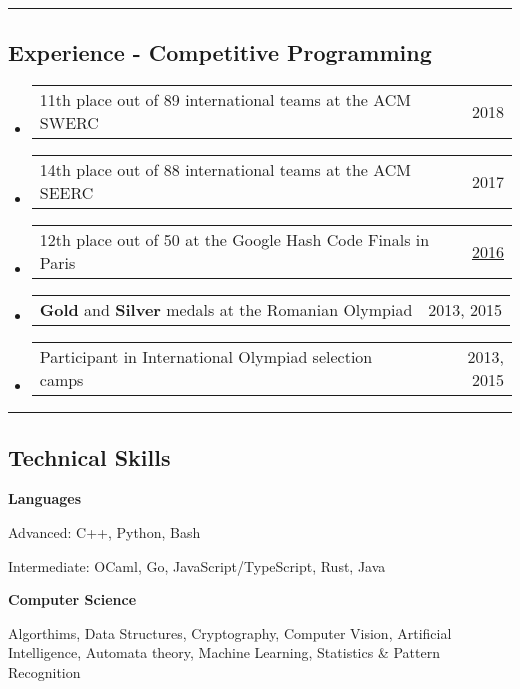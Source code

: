 \documentclass[10pt,letterpaper]{article}
\makeatletter
\newenvironment{indentsection}[1]%
{\begin{list}{}%
	{\setlength{\leftmargin}{#1}}%
	\item[]%
}
{\end{list}}
\newcommand{\headerrow}[2]
{\begin{tabular*}{\linewidth}{l@{\extracolsep{\fill}}r}
	#1 &
	#2 \\
\end{tabular*}}
\makeatother
\begin{document}
\hrule

\vspace{-1em}

\subsection*{Experience - Competitive Programming}
\begin{itemize}
	\parskip=0.1em
		\item
		\headerrow
			{11th place out of 89 international teams at the ACM SWERC}
			{2018}

		\item
		\headerrow
			{14th place out of 88 international teams at the ACM SEERC}
			{2017}

		\item
		\headerrow
			{12th place out of 50 at the Google Hash Code Finals in Paris}
            {\href{https://hashcode.withgoogle.com/hashcode_2016.html}{2016}}

        \item
		\headerrow
            {\textbf{Gold} and \textbf{Silver} medals at the Romanian Olympiad}
			{2013, 2015}

        \item
		\headerrow
            {Participant in International Olympiad selection camps}
			{2013, 2015}

\end{itemize}

\hrule
\vspace{-1em}

\subsection*{Technical Skills}

\begin{indentsection}{\parindent}
\begin{description*}
	\item
	{\textbf{Languages}}

	\begin{itemize*}
        \item {Advanced: C++, Python, Bash}
        \item {Intermediate: OCaml, Go, JavaScript/TypeScript, Rust, Java}
	\end{itemize*}

	\item
	{\textbf{Computer Science}}

    Algorthims, Data Structures, Cryptography, Computer Vision, Artificial
    Intelligence, Automata theory, Machine Learning, Statistics \& Pattern
    Recognition
\end{description*}
\end{indentsection}
\end{document}
